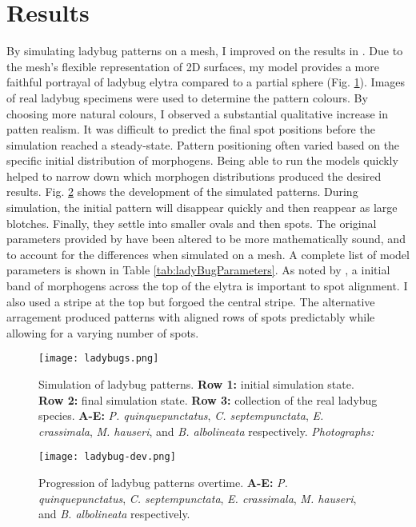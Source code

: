 \section{Results}
By simulating ladybug patterns on a mesh, I improved on the results in \citep{liaw2001}. Due to the mesh's flexible representation of 2D surfaces, my model provides a more faithful portrayal of ladybug elytra compared to a partial sphere (Fig. \ref{fig:ladyBugPatterns}). Images of real ladybug specimens were used to determine the pattern colours. By choosing more natural colours, I observed a substantial qualitative increase in patten realism. It was difficult to predict the final spot positions before the simulation reached a steady-state. Pattern positioning often varied based on the specific initial distribution of morphogens. Being able to run the models quickly helped to narrow down which morphogen distributions produced the desired results. Fig. \ref{fig:ladyBugDev} shows the development of the simulated patterns. During simulation, the initial pattern will disappear quickly and then reappear as large blotches. Finally, they settle into smaller ovals and then spots. The original parameters provided by \citet{liaw2001} have been altered to be more mathematically sound, and to account for the differences when simulated on a mesh. A complete list of model parameters is shown in Table \ref{tab:ladyBugParameters}. As noted by \citet{liaw2001}, a initial band of morphogens across the top of the elytra is important to spot alignment. I also used a stripe at the top but forgoed the central stripe. The alternative arragement produced patterns with aligned rows of spots predictably while allowing for a varying number of spots. 

\begin{figure}[ht]
	\centering
	\texttt{[image: ladybugs.png]}
	\caption{Simulation of ladybug patterns. \textbf{Row 1:} initial simulation state. \textbf{Row 2:} final simulation state. \textbf{Row 3:} collection of the real ladybug species. \textbf{A-E:} \textit{P. quinquepunctatus}, \textit{C. septempunctata}, \textit{E. crassimala}, \textit{M. hauseri}, and \textit{B. albolineata} respectively. 
	 \textit{Photographs: \citep{chen2008}}}
	\label{fig:ladyBugPatterns}
\end{figure}

\begin{figure}[ht]
	\centering
	\texttt{[image: ladybug-dev.png]}
	\caption{Progression of ladybug patterns overtime. \textbf{A-E:} \textit{P. quinquepunctatus}, \textit{C. septempunctata}, \textit{E. crassimala}, \textit{M. hauseri}, and \textit{B. albolineata} respectively.}
	\label{fig:ladyBugDev}
\end{figure}

